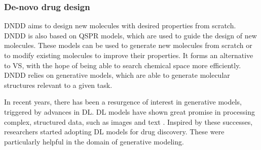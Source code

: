 

\subsubsection{De-novo drug design}
\ac{DNDD} aims to design new molecules with desired properties from scratch.
\ac{DNDD} is also based on \ac{QSPR} models, which are used to guide the
design of new molecules. These models can be used to generate new molecules
from scratch or to modify existing molecules to improve their properties.
It forms an alternative to \ac{VS}, with the hope of being able to search
chemical space more efficiently. \ac{DNDD} relies on generative models, 
which are able to generate molecular structures relevant to a given task.

In recent years, there has been a resurgence of interest in generative models,
triggered by advances in \ac{DL}. \ac{DL} models have shown great promise in
processing complex, structured data, such as images and text \citep{todo}.
Inspired by these successes, researchers started adopting \ac{DL} models for 
drug discovery. These were particularly helpful in the domain of generative
modeling.




